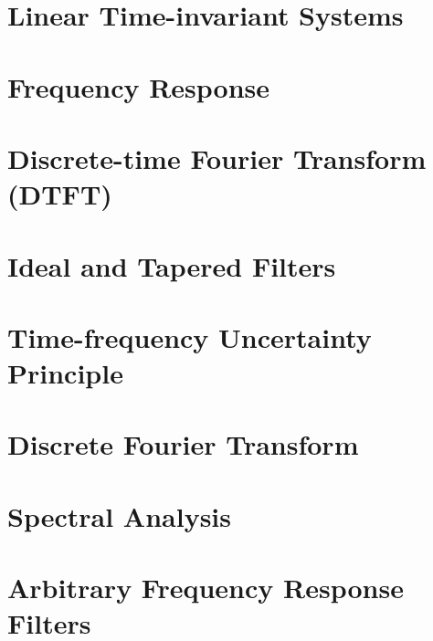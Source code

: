 \documentclass{tufte-book}
\begin{document}
\ifSpLTI
\chapter{Linear Time-invariant Systems}




 \ifSpExerciseSol
 
 \fi
\fi

\ifSpFResp
\chapter{Frequency Response}


 \ifSpExerciseSol
 
 \fi
\fi

\ifSpProgB

\fi

\ifSpDTFT
\chapter{Discrete-time Fourier Transform (DTFT)}


 \ifSpExerciseSol
 
 \fi
\fi

\ifSpFilters
\chapter{Ideal and Tapered Filters}


 \ifSpExerciseSol
 
 \fi
\fi

\ifSpUncertainty
\chapter{Time-frequency Uncertainty Principle}


 \ifSpExerciseSol
 
 \fi
\fi

\ifSpDFT
\chapter{Discrete Fourier Transform}


 \ifSpExerciseSol
 
 \fi
\fi

\ifSpSpectAn
\chapter{Spectral Analysis}


 \ifSpExerciseSol
 
 \fi
\fi

\ifSpFiltering
\chapter{Arbitrary Frequency Response Filters}


 \ifSpExerciseSol
 
 \fi
\fi
\end{document}
